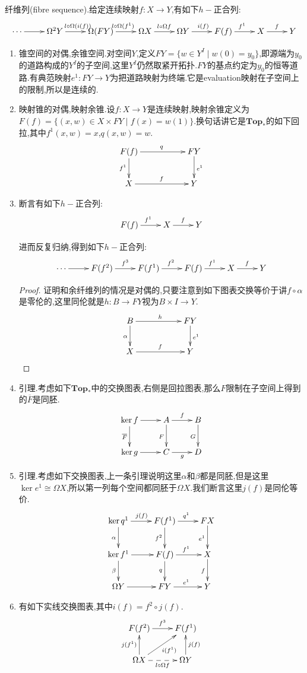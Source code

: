 纤维列(fibre sequence).给定连续映射$f:X\to Y$,有如下$h-$正合列:
$$\xymatrix{\cdots\ar[r]&\Omega^2Y\ar[r]^{l\circ\Omega(i(f))}&\Omega(FY)\ar[r]^{l\circ\Omega(f^1)}&\Omega X\ar[r]^{l\circ\Omega f}&\Omega Y\ar[r]^{i(f)}&F(f)\ar[r]^{f^1}&X\ar[r]^f&Y}$$
\begin{enumerate}
	\item 锥空间的对偶,余锥空间.对空间$Y$,定义$FY=\{w\in Y^I\mid w(0)=y_0\}$,即源端为$y_0$的道路构成的$Y^I$的子空间,这里$Y^I$仍然取紧开拓扑.$FY$的基点约定为$y_0$的恒等道路.有典范映射$e^1:FY\to Y$为把道路映射为终端.它是evaluation映射在子空间上的限制,所以是连续的.
	\item 映射锥的对偶,映射余锥.设$f:X\to Y$是连续映射,映射余锥定义为$F(f)=\{(x,w)\in X\times FY\mid f(x)=w(1)\}$.换句话讲它是$\textbf{Top}_*$的如下回拉,其中$f^1(x,w)=x$,$q(x,w)=w$.
	$$\xymatrix{F(f)\ar[rr]^q\ar[d]_{f^1}&&FY\ar[d]^{e^1}\\X\ar[rr]^f&&Y}$$
	\item 断言有如下$h-$正合列:
	$$\xymatrix{F(f)\ar[r]^{f^1}&X\ar[r]^f&Y}$$
	
	进而反复归纳,得到如下$h-$正合列:
	$$\xymatrix{\cdots\ar[r]&F(f^2)\ar[r]^{f^3}&F(f^1)\ar[r]^{f^2}&F(f)\ar[r]^{f^1}&X\ar[r]^f&Y}$$
	\begin{proof}
		
		证明和余纤维列的情况是对偶的,只要注意到如下图表交换等价于讲$f\circ\alpha$是零伦的,这里同伦就是$h:B\to FY$视为$B\times I\to Y$.
		$$\xymatrix{B\ar[rr]^h\ar[d]_{\alpha}&&FY\ar[d]^{e^1}\\X\ar[rr]^f&&Y}$$
	\end{proof}
    \item 引理.考虑如下$\textbf{Top}_*$中的交换图表,右侧是回拉图表,那么$F$限制在子空间上得到的$\overline{F}$是同胚.
    $$\xymatrix{\ker f\ar[r]\ar[d]_{\overline{F}}&A\ar[r]^f\ar[d]_F&B\ar[d]_G\\\ker g\ar[r]&C\ar[r]_g&D}$$
    \item 引理.考虑如下交换图表,上一条引理说明这里$\alpha$和$\beta$都是同胚,但是这里$\ker e^1\cong\Omega X$,所以第一列每个空间都同胚于$\Omega X$.我们断言这里$j(f)$是同伦等价.
    $$\xymatrix{\ker q^1\ar[r]^{j(f)}\ar[d]_{\alpha}&F(f^1)\ar[r]^{q^1}\ar[d]_{f^2}&FX\ar[d]_{e^1}\\\ker f^1\ar[r]\ar[d]_{\beta}&F(f)\ar[r]^{f^1}\ar[d]_q&X\ar[d]_f\\\Omega Y\ar[r]&FY\ar[r]^{e^1}&Y}$$
    \item 有如下实线交换图表,其中$i(f)=f^2\circ j(f)$.
    $$\xymatrix{F(f^2)\ar[r]^{f^3}&F(f^1)\\\Omega X\ar@{-->}[r]_{l\circ\Omega f}\ar[u]^{j(f^1)}\ar[ur]_{i(f^1)}&\Omega Y\ar[u]_{j(f)}}$$
    

\end{enumerate}

